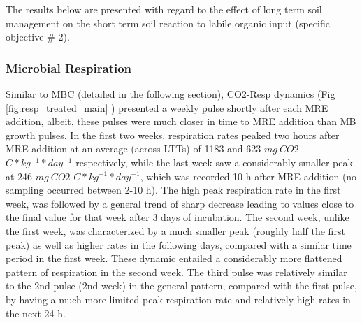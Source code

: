 		The results below are presented with regard to the effect of long term soil management on the short term soil reaction to labile organic input (specific objective \# 2).\\



		\subsubsection{Microbial Respiration}

		Similar to MBC (detailed in the following section), CO2-Resp dynamics (Fig \ref{fig:resp_treated_main} ) presented a weekly pulse shortly after each MRE addition, albeit, these pulses were much closer in time to MRE addition than MB growth pulses. In the first two weeks, respiration rates peaked two hours after MRE addition at an average (across LTTs) of 1183 and 623 $mg\ CO2$-$C*kg^{-1}*day^{-1}$ respectively, while the last week saw a considerably smaller peak at 246 $mg\ CO2$-$C*kg^{-1}*day^{-1}$, which was recorded 10 h after MRE addition (no sampling occurred between 2-10 h).
		The high peak respiration rate in the first week, was followed by a general trend of sharp decrease leading to values close to the final value for that week after 3 days of incubation. The second week, unlike the first week, was characterized by a much smaller peak (roughly half the first peak) as well as higher rates in the following days, compared with a similar time period in the first week. These dynamic entailed a considerably more flattened pattern of respiration in the second week. The third pulse was relatively similar to the 2nd pulse (2nd week) in the general pattern, compared with the first pulse, by having a much more limited peak respiration rate and relatively high rates in the next 24 h.\\



